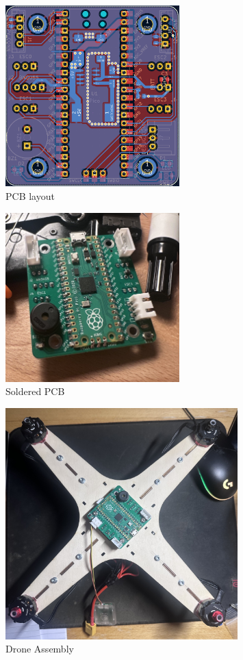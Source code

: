 \documentclass{article}
\begin{document}
\begin{figure}[H]
    \centering
    \includegraphics[width=0.6\textwidth]{board_pcb.png}
    \caption{PCB layout}
\end{figure}

\begin{figure}[H]
    \centering
    \includegraphics[width=0.6\textwidth]{board_soldered.jpg}
    \caption{Soldered PCB}
\end{figure}


\begin{figure}[H]
    \centering
    \includegraphics[width=0.8\textwidth]{built.jpg}
    \caption{Drone Assembly}
\end{figure}
\end{document}
